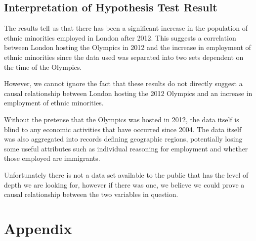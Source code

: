 \documentclass[12pt,twoside]{article}
\begin{document}
\subsection{Interpretation of Hypothesis Test Result}

The results tell us that there has been a significant increase in the population of ethnic minorities employed in London after 2012. This suggests a correlation between London hosting the Olympics  in 2012 and the increase in employment of ethnic minorities since the data used was separated into two sets dependent on the time of the Olympics.

However, we cannot ignore the fact that these results do not directly suggest a causal relationship between London hosting the 2012 Olympics and an increase in employment of ethnic minorities.

Without the pretense that the Olympics was hosted in 2012, the data itself is blind to any economic activities that have occurred since 2004. The data itself was also aggregated into records defining geographic regions, potentially losing some useful attributes such as individual reasoning for employment and whether those employed are immigrants.

Unfortunately there is not a data set available to the public that has the level of depth we are looking for, however if there was one, we believe we could prove a causal relationship between the two variables in question.





\newpage
\section{Appendix}
\end{document}

